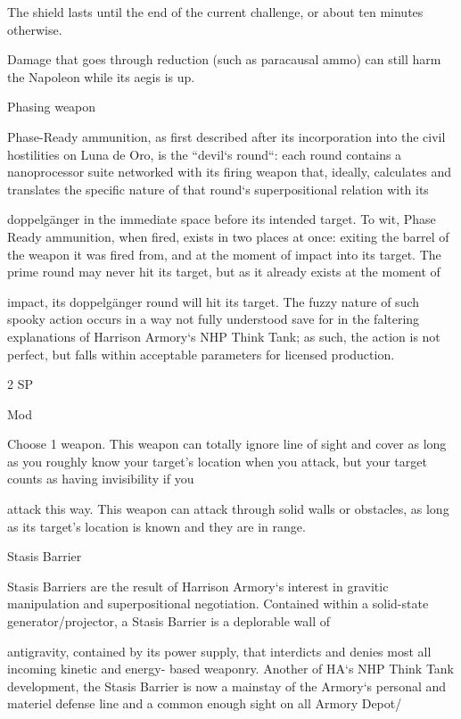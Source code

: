  The shield lasts until the end of the current challenge, or about ten minutes otherwise.
 
 Damage that goes through reduction (such as paracausal ammo) can still harm the Napoleon while its  
 aegis is up. 

Phasing weapon  

Phase-Ready ammunition, as first described after its incorporation into the civil hostilities on Luna de Oro,  
is the “devil‘s round“: each round contains a nanoprocessor suite networked with its firing weapon that,  
ideally, calculates and translates the specific nature of that round‘s superpositional relation with its  

doppelgänger in the immediate space before its intended target. To wit, Phase Ready ammunition, when  
fired, exists in two places at once: exiting the barrel of the weapon it was fired from, and at the moment of  
impact into its target. The prime round may never hit its target, but as it already exists at the moment of  

impact, its doppelgänger round will hit its target. The fuzzy nature of such spooky action occurs in a way  
not fully understood save for in the faltering explanations of Harrison Armory‘s NHP Think Tank; as such,  
the action is not perfect, but falls within acceptable parameters for licensed production.   

2 SP
 
Mod
 
Choose 1 weapon. This weapon can totally ignore line of sight and cover as long as you roughly  
know your target’s location when you attack, but your target counts as having invisibility if you  

                                                                                                                       


attack this way. This weapon can attack through solid walls or obstacles, as long as its target’s  
location is known and they are in range.
 

Stasis Barrier  

Stasis Barriers are the result of Harrison Armory‘s interest in gravitic manipulation and superpositional  
negotiation. Contained within a solid-state generator/projector, a Stasis Barrier is a deplorable wall of  

antigravity, contained by its power supply, that interdicts and denies most all incoming kinetic and energy- 
based weaponry. Another of HA‘s NHP Think Tank development, the Stasis Barrier is now a mainstay of the  
Armory‘s personal and materiel defense line and a common enough sight on all Armory Depot/ 

